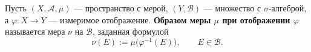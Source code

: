 \label{definition:28}

\begin{definition}
Пусть $(X,\mathcal A,\mu)$ --- пространство с мерой, $(Y,\mathcal B)$ --- множество с $\sigma$-алгеброй, а $\varphi:X\to Y$ --- измеримое отображение.
\textbf{Образом меры $\mu$ при отображении $\varphi$} называется мера $\nu$ на $\mathcal B$, заданная формулой
\[
  \nu(E):=\mu\bigl(\varphi^{-1}(E)\bigr),\qquad E\in\mathcal B.
\]
\end{definition}

